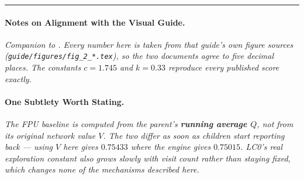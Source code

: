 \vfill

\noindent\rule{\linewidth}{0.4pt}

\paragraph{Notes on Alignment with the Visual Guide.}
\textit{Companion to . Every number here is taken from that guide's own figure sources (\texttt{guide/figures/fig\_2\_*.tex}), so the two documents agree to five decimal places. The constants $c = 1.745$ and $k = 0.33$ reproduce every published score exactly.}

\paragraph{One Subtlety Worth Stating.}
\textit{The FPU baseline is computed from the parent's \textbf{running average $Q$}, not from its original network value $V$. The two differ as soon as children start reporting back --- using $V$ here gives $0.75433$ where the engine gives $0.75015$. LC0's real exploration constant also grows slowly with visit count rather than staying fixed, which changes none of the mechanisms described here.}
